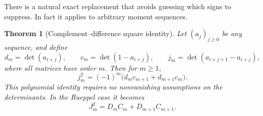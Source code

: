 \documentclass[11pt,a4paper]{article}
\numberwithin{equation}{section}
\newtheorem{theorem}{Theorem}[section]
\theoremstyle{definition}
\theoremstyle{remark}
\begin{document}
There is a natural exact replacement that avoids guessing which signs
to suppress. In fact it applies to arbitrary moment sequences.

\begin{theorem}[Complement--difference square identity]\label{thm:square}
Let $(a_j)_{j\ge0}$ be any sequence, and define
\[
 d_m=\det(a_{i+j}),\qquad c_m=\det(1-a_{i+j}),\qquad
 j_m=\det(a_{i+j+1}-a_{i+j}),
\]
where all matrices have order $m$. Then for $m\ge1$,
\begin{equation}\label{eq:generalsquare}
 j_m^2=(-1)^m\bigl(d_m c_{m+1}+d_{m+1}c_m\bigr).
\end{equation}
This polynomial identity requires no nonvanishing assumptions on the
determinants. In the Rueppel case it becomes
\begin{equation}\label{eq:rueppelsquare}
\boxed{\quad J_m^2=D_mC_m+D_{m+1}C_{m+1}.\quad}
\end{equation}
\end{theorem}
\end{document}
